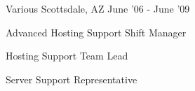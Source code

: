 \begin{cventries}
{\begin{cvitems}
        \end{cvitems}
    }
\vspace{0mm}
\cventry
    {Various} %
    {} %
    {Scottsdale, AZ} %
    {June '06 - June '09} %
    {
        \begin{cvitems}
		  \item Advanced Hosting Support Shift Manager
		  \item Hosting Support Team Lead 
		  \item Server Support Representative 
        \end{cvitems}
    }
\end{cventries}
